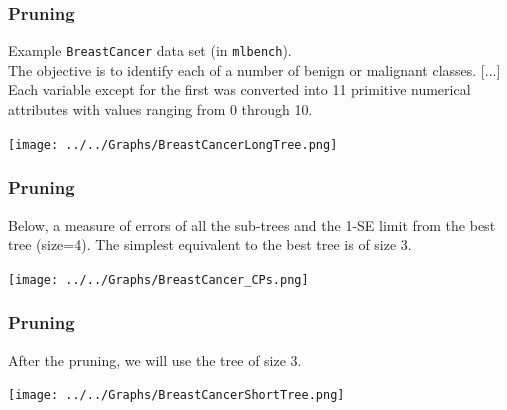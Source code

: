 \begin{frame}
\frametitle{Pruning}
Example {\tt BreastCancer} data set (in {\tt mlbench}).\\
\scriptsize
The objective is to identify each of a number of benign or malignant classes. [...] Each variable except for the first was converted into 11 primitive numerical attributes with values ranging from 0 through 10. 
\normalsize
\begin{center}
\texttt{[image: ../../Graphs/BreastCancerLongTree.png]}
\end{center}
\end{frame}
\begin{frame}
\frametitle{Pruning}
Below, a measure of errors of all the sub-trees and the 1-SE limit from the best tree (size=4). The simplest equivalent to the best tree is of size 3.
\begin{center}
\texttt{[image: ../../Graphs/BreastCancer\_CPs.png]}
\end{center}
\end{frame}
\begin{frame}
\frametitle{Pruning}
After the pruning, we will use the tree of size 3.
\begin{center}
\texttt{[image: ../../Graphs/BreastCancerShortTree.png]}
\end{center}
\end{frame}

